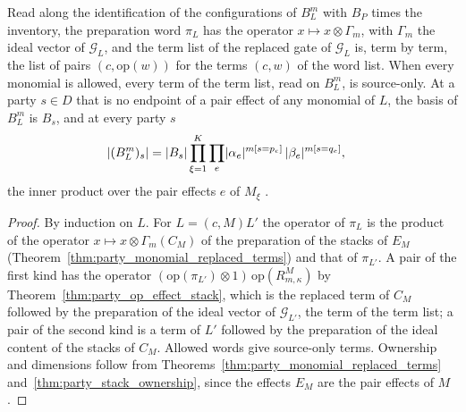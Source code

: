 \begin{theorem}
    \label{thm:party_replaced_gate_words}
    \leanok
    Read along the identification of the configurations of $B^m_L$ with $B_P$ times
    the inventory, the preparation word $\pi_L$ has the operator
    $x\mapsto x\otimes\Gamma_m$, with $\Gamma_m$ the ideal vector of $\mathcal G_L$,
    and the term list of the replaced gate of $\mathcal G_L$ is, term by term, the
    list of pairs $(c,\mathrm{op}(w))$ for the terms $(c,w)$ of the word list. When
    every monomial is allowed, every term of the term list, read on $B^m_L$, is
    source-only. At a party $s\in D$ that is no endpoint of a pair effect of any
    monomial of $L$, the basis of $B^m_L$ is $B_s$, and at every party $s$
    \begin{align}
        \lvert(B^m_L)_s\rvert
         & =\lvert B_s\rvert\prod_{\xi=1}^K\prod_{e}
        \lvert\alpha_e\rvert^{m[s=p_e]}\,\lvert\beta_e\rvert^{m[s=q_e]},
        \notag
    \end{align}
    the inner product over the pair effects $e$ of $M_\xi$
    \cite[Lemma~5.1]{OpenAI2026PolynomialPEPS}.
\end{theorem}

\begin{proof}\leanok
    By induction on $L$. For $L=(c,M)L'$ the operator of $\pi_L$ is the product of
    the operator $x\mapsto x\otimes\Gamma_{m}(C_M)$ of the preparation of the stacks
    of $E_M$ (Theorem~\ref{thm:party_monomial_replaced_terms}) and that of
    $\pi_{L'}$. A pair of the first kind has the
    operator $(\mathrm{op}(\pi_{L'})\otimes1)\,\mathrm{op}(R^M_{m,\kappa})$ by
    Theorem~\ref{thm:party_op_effect_stack}, which is the replaced term of $C_M$
    followed by the preparation of the ideal vector of $\mathcal G_{L'}$, the term of
    the term list; a pair of the second kind is a term of $L'$ followed by the
    preparation of the ideal content of the stacks of $C_M$. Allowed words give
    source-only terms. Ownership and dimensions follow from
    Theorems~\ref{thm:party_monomial_replaced_terms}
    and~\ref{thm:party_stack_ownership}, since the effects $E_M$ are the pair
    effects of $M$.
\end{proof}

